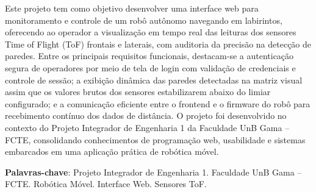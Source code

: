 \begin{resumo}
Este projeto tem como objetivo desenvolver uma interface web para monitoramento e controle de um robô autônomo navegando em labirintos, oferecendo ao operador a visualização em tempo real das leituras dos sensores Time of Flight (ToF) frontais e laterais, com auditoria da precisão na detecção de paredes. Entre os principais requisitos funcionais, destacam-se a autenticação segura de operadores por meio de tela de login com validação de credenciais e controle de sessão; a exibição dinâmica das paredes detectadas na matriz visual assim que os valores brutos dos sensores estabilizarem abaixo do limiar configurado; e a comunicação eficiente entre o frontend e o firmware do robô para recebimento contínuo dos dados de distância. O projeto foi desenvolvido no contexto do Projeto Integrador de Engenharia 1 da Faculdade UnB Gama – FCTE, consolidando conhecimentos de programação web, usabilidade e sistemas embarcados em uma aplicação prática de robótica móvel.

\vspace{\onelineskip}
\noindent
\textbf{Palavras-chave}: Projeto Integrador de Engenharia 1. Faculdade UnB Gama -- FCTE. Robótica Móvel. Interface Web. Sensores ToF.
\end{resumo}


    
